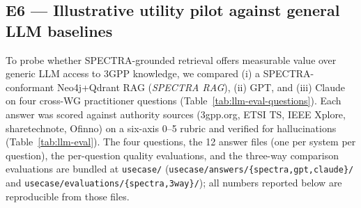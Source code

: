 \subsection{E6 --- Illustrative utility pilot against general LLM baselines}\label{sec:eval:llm}

To probe whether SPECTRA-grounded retrieval offers measurable value over generic LLM access to 3GPP knowledge, we compared (i) a SPECTRA-conformant Neo4j+Qdrant RAG (\emph{SPECTRA RAG}), (ii) GPT, and (iii) Claude on four cross-WG practitioner questions (Table~\ref{tab:llm-eval-questions}). Each answer was scored against authority sources (3gpp.org, ETSI TS, IEEE Xplore, sharetechnote, Ofinno) on a six-axis 0--5 rubric and verified for hallucinations (Table~\ref{tab:llm-eval}). The four questions, the 12 answer files (one per system per question), the per-question quality evaluations, and the three-way comparison evaluations are bundled at \texttt{usecase/} (\texttt{usecase/answers/\{spectra,gpt,claude\}/} and \texttt{usecase/evaluations/\{spectra,3way\}/}); all numbers reported below are reproducible from those files.

